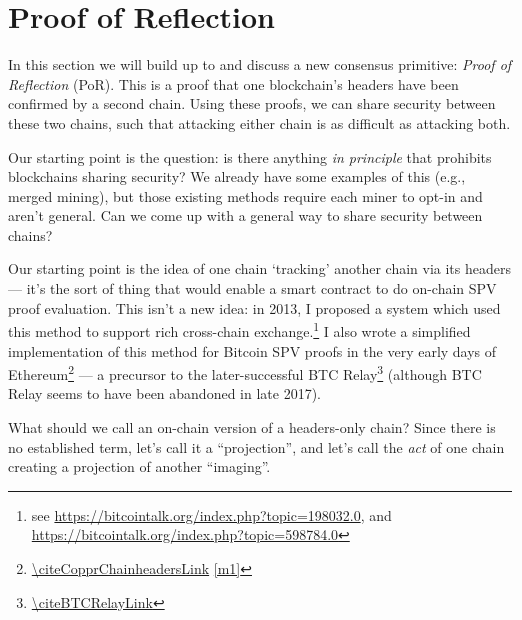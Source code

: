 \clearpage
\section{Proof of Reflection}
\label{sec:proof-of-reflection}

In this section we will build up to and discuss a new consensus primitive: \emph{Proof of Reflection} (PoR).
This is a proof that one blockchain's headers have been confirmed by a second chain.
Using these proofs, we can share security between these two chains, such that attacking either chain is as difficult as attacking both.

Our starting point is the question: is there anything \emph{in principle} that prohibits blockchains sharing security?
We already have some examples of this (e.g., merged mining), but those existing methods require each miner to opt-in and aren't general.
Can we come up with a general way to share security between chains?


Our starting point is the idea of one chain `tracking' another chain via its headers --- it's the sort of thing that would enable a smart contract to do on-chain SPV proof evaluation.
This isn't a new idea: in 2013, I proposed a system which used this method to support rich cross-chain exchange.\footnote{
  see \url{https://bitcointalk.org/index.php?topic=198032.0}, and
  \url{https://bitcointalk.org/index.php?topic=598784.0}
}
I also wrote a simplified implementation of this method for Bitcoin SPV proofs in the very early days of Ethereum\footnote{
    \url{\citeCopprChainheadersLink} \href{https://web.archive.org/web/20240927044057/https://raw.githubusercontent.com/XertroV/coppr/refs/heads/master/chainheaders.py}{[m1]}
} --- a precursor to the later-successful BTC Relay\footnote{
    \url{\citeBTCRelayLink}
} (although BTC Relay seems to have been abandoned in late 2017).

What should we call an on-chain version of a headers-only chain?
Since there is no established term, let's call it a ``projection'', and let's call the \emph{act} of one chain creating a projection of another ``imaging''.

